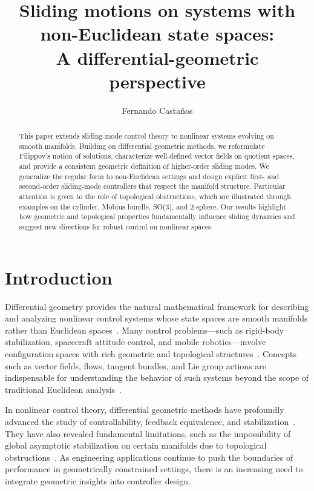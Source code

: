 \documentclass{article}
\theoremstyle{definition}
\theoremstyle{remark}
\begin{document}
\title{Sliding motions on systems with \\ non-Euclidean state spaces: \\ A differential-geometric perspective}

\author{Fernando Casta\~nos} 

\maketitle

\begin{abstract}
This paper extends sliding-mode control theory to nonlinear systems evolving on smooth manifolds. Building on
differential geometric methods, we reformulate Filippov's notion of solutions, characterize well-defined vector fields
on quotient spaces, and provide a consistent geometric definition of higher-order sliding modes. We generalize the
regular form to non-Euclidean settings and design explicit first- and second-order sliding-mode controllers that
respect the manifold structure. Particular attention is given to the role of topological obstructions, which are
illustrated through examples on the cylinder, M\"obius bundle, SO(3), and 2-sphere. Our results highlight how geometric and
topological properties fundamentally influence sliding dynamics and suggest new directions for robust control on nonlinear spaces.
\end{abstract}


\section{Introduction}

Differential geometry provides the natural mathematical framework for describing and analyzing nonlinear control systems
whose state spaces are smooth manifolds rather than Euclidean spaces~\cite{bullo,arnold2,isidori}. Many control
problems---such as rigid-body stabilization, spacecraft attitude control, and mobile robotics---involve configuration spaces
with rich geometric and topological structures~\cite{sastry,bullo}. Concepts such as vector fields, flows, tangent bundles,
and Lie group actions are indispensable for understanding the behavior of such systems beyond the scope of traditional Euclidean
analysis~\cite{lee}.

In nonlinear control theory, differential geometric methods have profoundly advanced the study of controllability, feedback
equivalence, and stabilization~\cite{jurdjevic1978,isidori,sastry,nijmeijer,brockett2014}. They have also revealed fundamental
limitations, such as the impossibility of global asymptotic stabilization on certain manifolds due to topological
obstructions~\cite{bhat2000,jongeneel}. As engineering applications continue to push the boundaries of performance in
geometrically constrained settings, there is an increasing need to integrate geometric insights into controller design.
\end{document}
